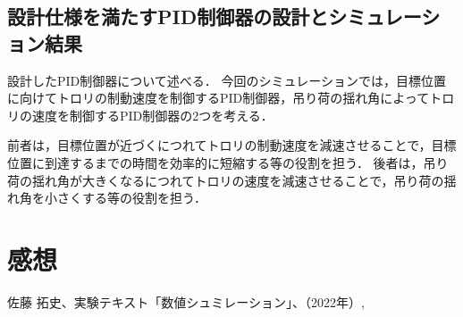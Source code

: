 \documentclass[dvipdfmx,titlepage,a4j]{jsarticle}  %
\begin{document}
\subsection{設計仕様を満たすPID制御器の設計とシミュレーション結果}
設計したPID制御器について述べる．
今回のシミュレーションでは，目標位置に向けてトロリの制動速度を制御するPID制御器，吊り荷の揺れ角によってトロリの速度を制御するPID制御器の2つを考える．

前者は，目標位置が近づくにつれてトロリの制動速度を減速させることで，目標位置に到達するまでの時間を効率的に短縮する等の役割を担う．
後者は，吊り荷の揺れ角が大きくなるにつれてトロリの速度を減速させることで，吊り荷の揺れ角を小さくする等の役割を担う．


\section{感想}

\begin{thebibliography}{99}
   佐藤 拓史、実験テキスト「数値シュミレーション」、（2022年）,
\end{thebibliography}
\end{document}
